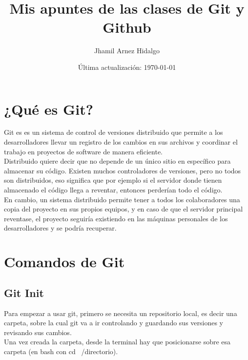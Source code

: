 \documentclass[13pt]{article}
\title{Mis apuntes de las clases de Git y Github}
\author{Jhamil Arnez Hidalgo}
\date{Última actualización: \today}
\begin{document}
\maketitle


\section{¿Qué es Git?}
Git es es un sistema de control de versiones distribuido que permite a los desarrolladores llevar un registro de los cambios en sus archivos y coordinar el trabajo en proyectos de software de manera eficiente.\\

Distribuido quiere decir que no depende de un único sitio en específico para almacenar su código. Existen muchos controladores de versiones, pero no todos son distribuidos, eso significa que por ejemplo si el servidor donde tienen almacenado el código llega a reventar, entonces perderían todo el código.\\

En cambio, un sistema distribuido permite tener a todos los colaboradores una copia del proyecto en sus propios equipos, y en caso de que el servidor principal reventase, el proyecto seguiría existiendo en las máquinas personales de los desarrolladores y se podría recuperar.

\section{Comandos de Git}

\subsection{Git Init}
Para empezar a usar git, primero se necesita un repositorio local, es decir una carpeta, sobre la cual git va a ir controlando y guardando sus versiones y revisando sus cambios.\\

Una vez creada la carpeta, desde la terminal hay que posicionarse sobre esa carpeta (en bash con cd ~/directorio).\\
\end{document}
